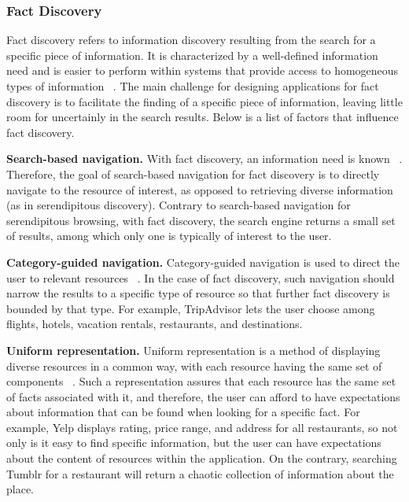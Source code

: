 \documentclass{casconpaper}
\begin{document}
{{} %

{\subsubsection{Fact Discovery}
Fact discovery refers to information discovery resulting from the search for a specific piece of information. It is characterized by a well-defined information need and is easier to perform within systems that provide access to homogeneous types of information ~\cite{kellar2006, lindley}. The main challenge for designing applications for fact discovery is to facilitate the finding of a specific piece of information, leaving little room for uncertainly in the search results. Below is a list of factors that influence fact discovery. 

\textbf{Search-based navigation.} With fact discovery, an information need is known ~\cite{kellar2006, kellar2007}. Therefore, the goal of search-based navigation for fact discovery is to directly navigate to the resource of interest, as opposed to retrieving diverse information (as in serendipitous discovery). Contrary to search-based navigation for serendipitous browsing, with fact discovery, the search engine returns a small set of results, among which only one is typically of interest to the user.

\textbf{Category-guided navigation.} Category-guided navigation is used to direct the user to relevant resources ~\cite{levene}. In the case of fact discovery, such navigation should narrow the results to a specific type of resource so that further fact discovery is bounded by that type. For example, TripAdvisor lets the user choose among flights, hotels, vacation rentals, restaurants, and destinations.

\textbf{Uniform representation.} Uniform representation is a method of displaying diverse resources in a common way, with each resource having the same set of components ~\cite{herrera}. Such a representation assures that each resource has the same set of facts associated with it, and therefore, the user can afford to have expectations about information that can be found when looking for a specific fact. For example, Yelp displays rating, price range, and address for all restaurants, so not only is it easy to find specific information, but the user can have expectations about the content of resources within the application. On the contrary, searching Tumblr for a restaurant will return a chaotic collection of information about the place. 

}}
\end{document}
